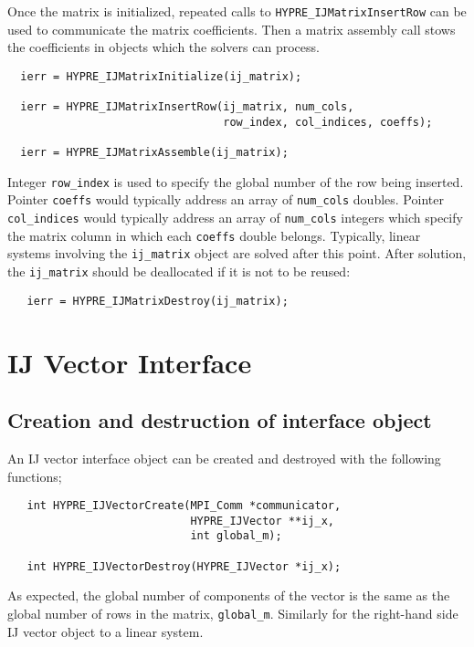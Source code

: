 Once the matrix is initialized, repeated calls to
\verb+HYPRE_IJMatrixInsertRow+ can be used to communicate
the matrix coefficients.  Then a matrix assembly call stows
the coefficients in objects which the solvers can process. 

\begin{verbatim}
  ierr = HYPRE_IJMatrixInitialize(ij_matrix);

  ierr = HYPRE_IJMatrixInsertRow(ij_matrix, num_cols,
                                 row_index, col_indices, coeffs);

  ierr = HYPRE_IJMatrixAssemble(ij_matrix);
\end{verbatim}

\noindent Integer \verb+row_index+ is used to specify the global
number of the row being inserted.
\noindent Pointer \verb+coeffs+ would typically address an array of
\verb+num_cols+ doubles.
Pointer \verb+col_indices+ would typically
address an array of \verb+num_cols+ integers which specify the
matrix column in which each \verb+coeffs+ double belongs.  
Typically, linear systems involving the \verb+ij_matrix+
object are solved after this point.  After solution, the
\verb+ij_matrix+ should be deallocated if it is not to be reused:

\begin{verbatim}
   ierr = HYPRE_IJMatrixDestroy(ij_matrix);
\end{verbatim}

\section{IJ Vector Interface}

\subsection{Creation and destruction of interface object}

An IJ vector interface object can be created and destroyed with
the following functions;
\begin{verbatim}
   int HYPRE_IJVectorCreate(MPI_Comm *communicator,
                            HYPRE_IJVector **ij_x,
                            int global_m);

   int HYPRE_IJVectorDestroy(HYPRE_IJVector *ij_x);
\end{verbatim}

\noindent As expected, the global number of components of the
vector is the same as the global number of rows in the matrix,
\verb+global_m+.
Similarly for the right-hand side IJ vector object to a linear
system.

